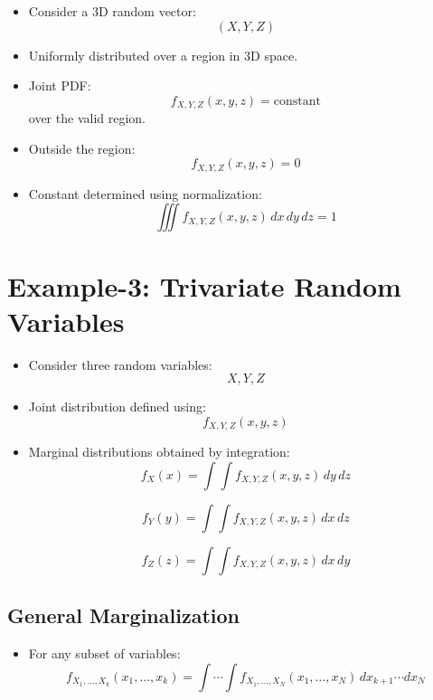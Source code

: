\documentclass[11pt]{article}
\begin{document}
\begin{itemize}
    \item Consider a 3D random vector:
    \[
    (X, Y, Z)
    \]
    
    \item Uniformly distributed over a region in 3D space.
    
    \item Joint PDF:
    \[
    f_{X,Y,Z}(x,y,z) = \text{constant}
    \]
    over the valid region.
    
    \item Outside the region:
    \[
    f_{X,Y,Z}(x,y,z) = 0
    \]
    
    \item Constant determined using normalization:
    \[
    \iiint f_{X,Y,Z}(x,y,z)\,dx\,dy\,dz = 1
    \]
\end{itemize}

\section{Example-3: Trivariate Random Variables}

\begin{itemize}
    \item Consider three random variables:
    \[
    X, Y, Z
    \]
    
    \item Joint distribution defined using:
    \[
    f_{X,Y,Z}(x,y,z)
    \]
    
    \item Marginal distributions obtained by integration:
    \[
    f_X(x) = \int \int f_{X,Y,Z}(x,y,z)\, dy\, dz
    \]
    
    \[
    f_Y(y) = \int \int f_{X,Y,Z}(x,y,z)\, dx\, dz
    \]
    
    \[
    f_Z(z) = \int \int f_{X,Y,Z}(x,y,z)\, dx\, dy
    \]
\end{itemize}

\subsection{General Marginalization}

\begin{itemize}
    \item For any subset of variables:
    \[
    f_{X_1, \dots, X_k}(x_1, \dots, x_k)
    = \int \cdots \int f_{X_1, \dots, X_N}(x_1, \dots, x_N)\, dx_{k+1}\cdots dx_N
    \]
\end{itemize}

\end{document}
